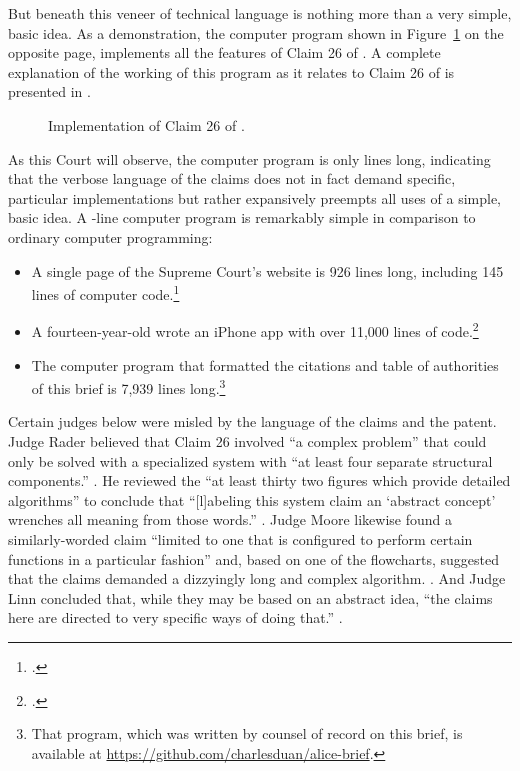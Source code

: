 \documentclass{scotus}
\begin{document}
But beneath this veneer
of technical language is nothing more than a very simple, basic idea. As a
demonstration, the computer program shown in Figure~\ref{code-listing}
on the opposite page,
implements all the features of Claim 26 of .
A complete explanation of the working of
this program as it relates to Claim 26 of  is presented in
.

\def\floatpagefraction{.1}
\begin{figure}[p]
\inlinebox{\wholeprogram}%
\baselineskip
\caption{Implementation of Claim 26 of \protect{}.}
\label{code-listing}
\end{figure}

As this Court will observe, the computer program is only \numlines lines long,
indicating that
the verbose language of the claims does not in fact demand specific, particular
implementations but rather expansively preempts all uses of a simple, basic
idea. A \numlines-line computer program is remarkably simple in comparison to
ordinary computer programming:
\begin{itemize}
\item A single page of the Supreme Court's website is 926 lines long, including
145 lines of computer code.\footnote{.}
\item A fourteen-year-old wrote an iPhone app with over 11,000 lines of
code.\footnote{.}
\item The computer program that formatted the citations
and table of authorities of this brief is 7,939 lines long.\footnote{That
program, which was written by counsel of record on this brief, is available at
\url{https://github.com/charlesduan/alice-brief}.}
\end{itemize}

Certain
judges below were misled by the language of the
claims and the patent.
Judge Rader believed that Claim 26 involved
``a complex problem'' that could only be solved with a specialized system
with ``at least four separate structural components.'' . He reviewed the ``at least thirty two figures
which
provide detailed algorithms'' to conclude that ``[l]abeling
this system claim an `abstract concept' wrenches all meaning from those words.''
. Judge Moore likewise found a
similarly-worded claim ``limited to one that is configured to perform certain
functions in a particular fashion'' and, based on one of the
flowcharts, suggested that the claims demanded a dizzyingly long
and complex algorithm. . And Judge Linn
concluded that, while they may be based
on an abstract idea, ``the claims here are directed to very specific ways of
doing that.''
.
\end{document}
